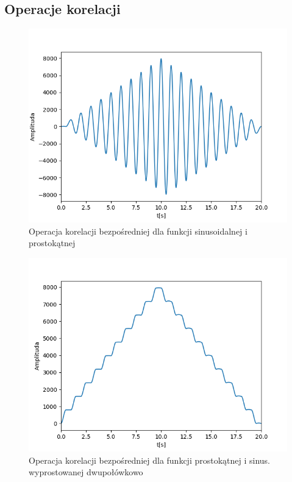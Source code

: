 \documentclass[12pt]{article}
\begin{document}
\subsection{Operacje korelacji}
\begin{figure}[H]
\centering
\includegraphics[scale=0.6]{korelacjaSinusProstokat.png}
\caption{Operacja korelacji bezpośredniej dla funkcji sinusoidalnej i prostokątnej}
\end{figure}

\begin{figure}[H]
\centering
\includegraphics[scale=0.6]{korelacjaProstokatDwupolowkowy.png}
\caption{Operacja korelacji bezpośredniej dla funkcji prostokątnej i sinus. wyprostowanej dwupołówkowo}
\end{figure}
\end{document}

